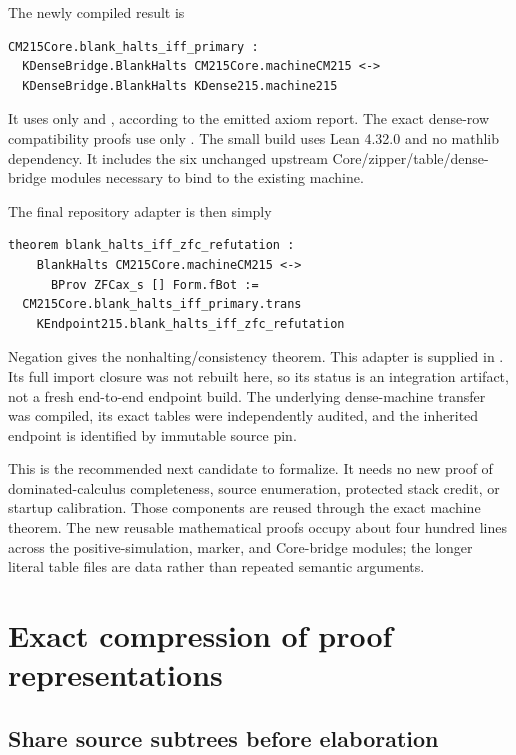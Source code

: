\documentclass[11pt]{article}
\newcommand{\code}[1]{\texttt{\detokenize{#1}}}
\begin{document}
The newly compiled result is
\begin{lstlisting}
CM215Core.blank_halts_iff_primary :
  KDenseBridge.BlankHalts CM215Core.machineCM215 <->
  KDenseBridge.BlankHalts KDense215.machine215
\end{lstlisting}
It uses only \code{propext} and \code{Quot.sound}, according to the emitted axiom report. The exact dense-row compatibility proofs use only \code{propext}. The small build uses Lean 4.32.0 and no mathlib dependency. It includes the six unchanged upstream Core/zipper/table/dense-bridge modules necessary to bind to the existing machine.

\noindent\begin{minipage}{\linewidth}
The final repository adapter is then simply
\begin{lstlisting}
theorem blank_halts_iff_zfc_refutation :
    BlankHalts CM215Core.machineCM215 <->
      BProv ZFCax_s [] Form.fBot :=
  CM215Core.blank_halts_iff_primary.trans
    KEndpoint215.blank_halts_iff_zfc_refutation
\end{lstlisting}
\end{minipage}
Negation gives the nonhalting/consistency theorem. This adapter is supplied in . Its full import closure was not rebuilt here, so its status is an integration artifact, not a fresh end-to-end endpoint build. The underlying dense-machine transfer was compiled, its exact tables were independently audited, and the inherited endpoint is identified by immutable source pin.

This is the recommended next candidate to formalize. It needs no new proof of dominated-calculus completeness, source enumeration, protected stack credit, or startup calibration. Those components are reused through the exact machine theorem. The new reusable mathematical proofs occupy about four hundred lines across the positive-simulation, marker, and Core-bridge modules; the longer literal table files are data rather than repeated semantic arguments.

\section{Exact compression of proof representations}

\subsection{Share source subtrees before elaboration}
\end{document}
